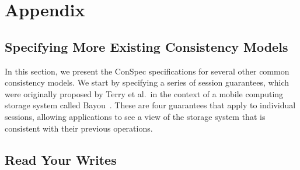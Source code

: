 \documentclass[conference]{IEEEtran}
\begin{document}
	
	\section{Appendix}
	\subsection{Specifying  More Existing Consistency Models}\label{sec:morelist}
	In this section, we present the ConSpec specifications for several other common
	consistency models. 
	We start by specifying a series of session guarantees, which were originally proposed by Terry et al.\ in the context of a mobile computing storage system called Bayou~\cite{Terry:1994:SGW:645792.668302}. These are four guarantees that apply to individual sessions, allowing applications to see a view of the storage system that is consistent with their previous operations.
	\subsection{Read Your Writes}
	
\end{document}
